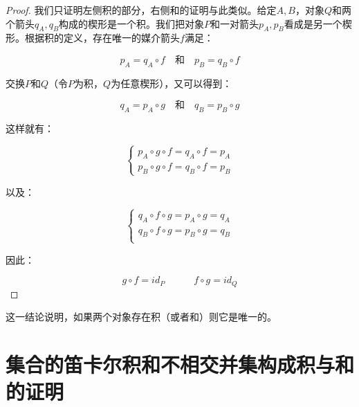 \documentclass[UTF8]{article}
\begin{document}
\begin{proof}
我们只证明左侧积的部分，右侧和的证明与此类似。给定$A, B$，对象$Q$和两个箭头$q_A, q_B$构成的楔形是一个积。我们把对象$P$和一对箭头$p_A, p_B$看成是另一个楔形。根据积的定义，存在唯一的媒介箭头$f$满足：

\[
p_A = q_A \circ f \quad \text{和} \quad p_B = q_B \circ f
\]

交换$P$和$Q$（令$P$为积，$Q$为任意楔形），又可以得到：

\[
q_A = p_A \circ g \quad \text{和} \quad q_B = p_B \circ g
\]

这样就有：

\[
\begin{cases}
p_A \circ g \circ f = q_A \circ f = p_A \\
p_B \circ g \circ f = q_B \circ f = p_B
\end{cases}
\]

以及：

\[
\begin{cases}
q_A \circ f \circ g = p_A \circ g = q_A \\
q_B \circ f \circ g = p_B \circ g = q_B \\
\end{cases}
\]

因此：

\[
g \circ f = id_P \quad \quad \quad f \circ g = id_Q
\]

\end{proof}

这一结论说明，如果两个对象存在积（或者和）则它是唯一的。

\chapter*{集合的笛卡尔积和不相交并集构成积与和的证明}
\end{document}
